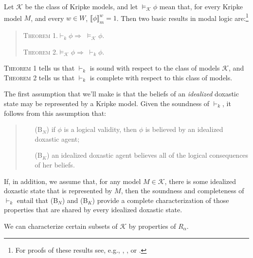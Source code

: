 

Let $\mathcal{K}$ be the class of Kripke models, and let $\models_{\mathcal{K}} \phi$ mean that, for every Kripke model $M$, and every $w \in W$, $\llbracket \phi \rrbracket^w_m =1$. 
Then two basic results in modal logic are:\footnote{For proofs of these results see, e.g., \citet{HughesCresswell}, \citet{Chellas}, or \citet{Blackburn}.}

\begin{quote}

\textsc{Theorem 1.}\quad $\vdash_k \phi \Rightarrow \; \models_{\mathcal{K}} \phi$.

\textsc{Theorem 2.}\quad $\models_{\mathcal{K}} \phi \Rightarrow \; \vdash_k \phi$.

\end{quote}
\textsc{Theorem 1} tells us that $\vdash_k$ is sound with respect to the class of models $\mathcal{K}$, and \textsc{Theorem 2} tells us that $\vdash_k$ is complete with respect to this class of models.

The first assumption that we'll make is that the beliefs of an \textit{idealized} doxastic state may be represented by a Kripke model.
Given the soundness of $\vdash_k$, it follows from this assumption that:

\begin{quote}
\begin{itemize}
\item[(B$_N$)] if $\phi$ is a logical validity, then $\phi$ is believed by an idealized doxastic agent; 
\item[(B$_K$)] an idealized doxastic agent believes all of the logical consequences of her beliefs.
\end{itemize}
\end{quote}
If, in addition, we assume that, for any model $M \in \mathcal{K}$, there is some idealized doxastic state that is represented by $M$, then the soundness and completeness of $\vdash_k$ entail that (B$_N$) and (B$_K$) provide a complete characterization of those properties that are shared by every idealized doxastic state. 

We can characterize certain subsets of $\mathcal{K}$ by properties of $R_\alpha$.

